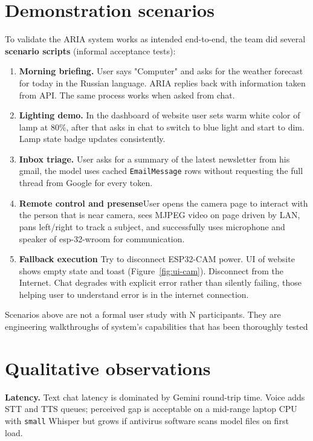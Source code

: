 \section{Demonstration scenarios}

To validate the ARIA system works as intended end-to-end, the team did several \textbf{scenario scripts} (informal acceptance tests):

\begin{enumerate}
    \item \textbf{Morning briefing.} User says "Computer" and asks for the weather forecast for today in the Russian language. ARIA replies back with information taken from API. The same process works when asked from chat.
    \item \textbf{Lighting demo.} In the dashboard of website user sets warm white color of lamp at 80\%, after that asks in chat to switch to blue light and start to dim. Lamp state badge updates consistently.
    \item \textbf{Inbox triage.} User asks for a summary of the latest newsletter from his gmail, the model uses cached \texttt{EmailMessage} rows without requesting the full thread from Google for every token.
    \item \textbf{Remote control and presense}User opens the camera page to interact with the person that is near camera, sees MJPEG video on page driven by LAN, pans left/right to track a subject, and successfully uses microphone and speaker of esp-32-wroom for communication.
    \item \textbf{Fallback execution} Try to disconnect ESP32-CAM power. UI of website shows empty state and toast (Figure~\ref{fig:ui-cam}). Disconnect from the Internet. Chat degrades with explicit error rather than silently failing, those helping user to understand error is in the internet connection.
\end{enumerate}




Scenarios above are not a formal user study with N participants. They are engineering walkthroughs of system's capabilities that has been thoroughly tested

\section{Qualitative observations}

\textbf{Latency.} Text chat latency is dominated by Gemini round-trip time. Voice adds STT and TTS queues; perceived gap is acceptable on a mid-range laptop CPU with \texttt{small} Whisper but grows if antivirus software scans model files on first load.

